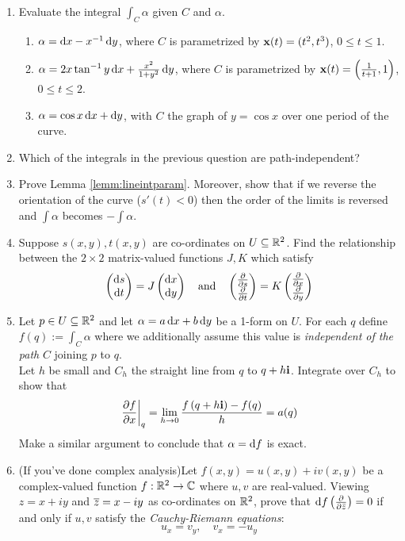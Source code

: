\begin{exercises}
\begin{enumerate}
	
	

	  \item Evaluate the integral $\int_C\alpha$ given $C$ and $\alpha$.\vspace{-6pt}
	  \begin{enumerate}\itemsep2pt
	    \item $\alpha=\dx-x^{-1}\,\dy$, where $C$ is parametrized by $\vx(t)=(t^2,t^3)$, $0\le t\le 1$.
	    \item $\alpha=2x\tan^{-1}y\,\dx+\frac{x^2}{1+y^2}\,\dy$, where $C$ is parametrized by $\vx(t)=\left(\frac 1{t+1},1\right)$, $0\le t\le 2$.
	    \item $\alpha=\cos x\,\dx+\dy$, with $C$ the graph of $y=\cos x$ over one period of the curve.
		\end{enumerate}
	
	
		\item Which of the integrals in the previous question are path-independent?
	
	
		\item Prove Lemma \ref{lemm:lineintparam}. Moreover, show that if we reverse the orientation of the curve ($s'(t)<0$) then the order of the limits is reversed and $\int\alpha$ becomes $-\int\alpha$.
	

		\item Suppose $s(x,y), t(x,y)$ are co-ordinates on $U\subseteq\R^2$. Find the relationship between the $2\times 2$ matrix-valued functions $J,K$ which satisfy
		\[
			\twovec{\ds}{\dt}=J\twovec{\dx}{\dy}\quad\text{and}\quad 
			\twovec{\partials s}{\partials t}=K\twovec{\partials x}{\partials y}
		\]

	
		\item Let $p\in U\subseteq\R^2$ and let $\alpha=a\,\dx+b\,\dy$ be a 1-form on $U$. For each $q$ define $f(q):=\int_C\alpha$ where we additionally assume this value is \emph{independent of the path} $C$ joining $p$ to $q$.\\
		Let $h$ be small and $C_h$ the straight line from $q$ to $q+h\vi$. Integrate over $C_h$ to show that
		\[
			\partialsat[f]{x}{q}=\lim\limits_{h\to 0}\frac{f\left(q+h\vi\right)-f(q)}h=a(q)
		\]
		Make a similar argument to conclude that $\alpha=\df$ is exact.
	
	
		\item (If you've done complex analysis)\quad Let $f(x,y)=u(x,y)+iv(x,y)$ be a complex-valued function $f:\R^2\to\C$ where $u,v$ are real-valued. Viewing $z=x+iy$ and $\cl z=x-iy$ as co-ordinates on $\R^2$, prove that $\df\left(\partials{\bar z}\right)=0$ if and only if $u,v$ satisfy the \emph{Cauchy-Riemann equations}:
		\[
			u_x=v_y,\quad v_x=-u_y
		\]
\end{enumerate}
\end{exercises}


